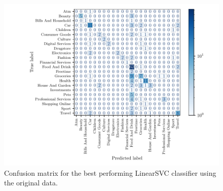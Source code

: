 \begin{figure}[ht]
  \centering
  \includegraphics[width=\scale\textwidth]{../img/plot_cm_LinearSVC_original.pdf}
  \caption{Confusion matrix for the best performing LinearSVC classifier using the original data.}
  \label{fig:confusion_matrix}
\end{figure}


